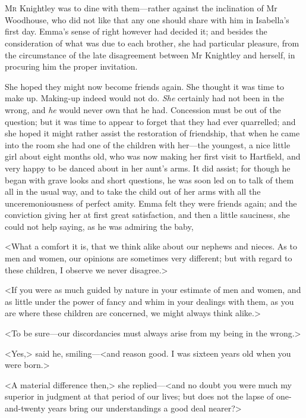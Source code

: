 \chapter[Chapter \thechapter]{}
\lettrine[lraise=0.3]{M}{r} Knightley was to dine with them—rather against the inclination of Mr Woodhouse, who did not like that any one should share with him in Isabella's first day. Emma's sense of right however had decided it; and besides the consideration of what was due to each brother, she had particular pleasure, from the circumstance of the late disagreement between Mr Knightley and herself, in procuring him the proper invitation.

She hoped they might now become friends again. She thought it was time to make up. Making-up indeed would not do. \textit{She} certainly had not been in the wrong, and \textit{he} would never own that he had. Concession must be out of the question; but it was time to appear to forget that they had ever quarrelled; and she hoped it might rather assist the restoration of friendship, that when he came into the room she had one of the children with her—the youngest, a nice little girl about eight months old, who was now making her first visit to Hartfield, and very happy to be danced about in her aunt's arms. It did assist; for though he began with grave looks and short questions, he was soon led on to talk of them all in the usual way, and to take the child out of her arms with all the unceremoniousness of perfect amity. Emma felt they were friends again; and the conviction giving her at first great satisfaction, and then a little sauciness, she could not help saying, as he was admiring the baby,

<What a comfort it is, that we think alike about our nephews and nieces. As to men and women, our opinions are sometimes very different; but with regard to these children, I observe we never disagree.>

<If you were as much guided by nature in your estimate of men and women, and as little under the power of fancy and whim in your dealings with them, as you are where these children are concerned, we might always think alike.>

<To be sure—our discordancies must always arise from my being in the wrong.>

<Yes,> said he, smiling—<and reason good. I was sixteen years old when you were born.>

<A material difference then,> she replied—<and no doubt you were much my superior in judgment at that period of our lives; but does not the lapse of one-and-twenty years bring our understandings a good deal nearer?>

